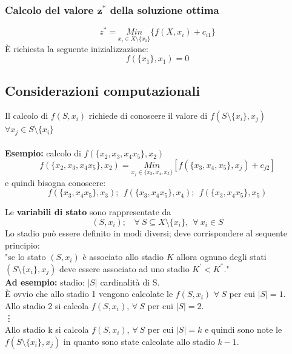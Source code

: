 \subsubsection{Calcolo del valore $\boldsymbol{z^{*}}$ della soluzione ottima}
\begin{equation*}
	z^{*}=\underset{x_{i}\in X\setminus\{x_{1}\}}{Min}\{f(X,x_{i})+c_{i1}\}
\end{equation*}
È richiesta la seguente inizializzazione:
\begin{equation*}
	f(\{x_{1}\},x_{1})=0
\end{equation*}
\clearpage
\subsection{Considerazioni computazionali}
Il calcolo di $f(S,x_{i})$ richiede di conoscere il valore di $f(S\setminus\{x_{i}\}, x_{j})$ $\forall x_{j}\in S\setminus\{x_{i}\}$\\\\
\textbf{Esempio:} calcolo di $f(\{x_{2},x_{3},x_{4}x_{5}\},x_{2})$
\begin{equation*}
	f(\{x_{2},x_{3},x_{4}x_{5}\},x_{2})=\underset{x_{j}\in\{x_{3},x_{4},x_{5}\}}{Min}[f(\{x_{3},x_{4},x_{5}\},x_{j})+c_{j2}]
\end{equation*}
e quindi bisogna conoscere:
\begin{equation*}
	f(\{x_{3},x_{4}x_{5}\},x_{3});\ \ f(\{x_{3},x_{4}x_{5}\},x_{4});\ \ f(\{x_{3},x_{4}x_{5}\},x_{5})
\end{equation*}

Le \textbf{variabili di stato} sono rappresentate da
\begin{equation*}
	(S,x_{i});\ \ \ \ \forall\ S\subseteq X\setminus\{x_{i}\},\ \ \forall\ x_{i}\in S
\end{equation*}
Lo stadio può essere definito in modi diversi; deve corrispondere al sequente principio:\\

"se lo stato $(S,x_{i})$ è associato allo stadio $K$ allora ognuno degli stati $(S\setminus\{x_{i}\},x_{j})$ deve essere associato ad uno stadio $K^{'}<K^{''}$."\\

\textbf{Ad esempio:} stadio: $|S|$ cardinalità di S.\\
È ovvio che allo stadio 1 vengono calcolate le $f(S,x_{i})$ $\forall\ S$ per cui $|S|=1$.\\
Allo stadio 2 si calcola $f(S,x_{i})$, $\forall\ S$ per cui $|S|=2$.\\
\vdots\\
Allo stadio k si calcola $f(S,x_{i})$, $\forall\ S$ per cui $|S|=k$ e quindi sono note le $f(S\setminus\{x_{i}\},x_{j})$ in quanto sono state calcolate allo stadio $k-1$.\\

